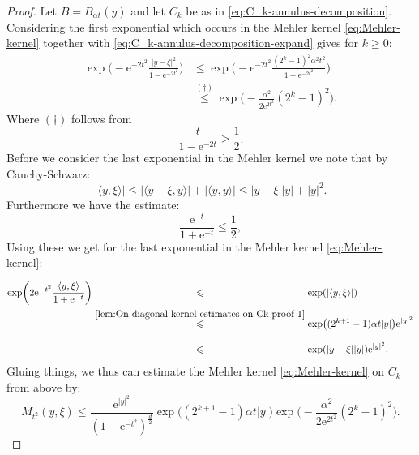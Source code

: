 \documentclass[a4paper,oneside,10pt]{amsproc}
\theoremstyle{remark}
\newcommand{\la}{\langle}
\newcommand{\ra}{\rangle}
\renewcommand{\leq}{\leqslant}
\renewcommand{\leq}{\leqslant}
\renewcommand{\geq}{\geqslant}
\newcommand{\e}{\mathrm{e}} %
\renewcommand{\leq}{\leqslant}%
\renewcommand{\geq}{\geqslant}%
\begin{document}
\begin{proof}
  Let $B = B_{\alpha t}(y)$ and let $C_k$ be as in
  \eqref{eq:C_k-annulus-decomposition}. Considering the first
  exponential which occurs in the Mehler kernel
  \eqref{eq:Mehler-kernel} together with
  \eqref{eq:C_k-annulus-decomposition-expand} gives for $k \geq 0$:
  \begin{align*}
    \exp\biggl(-\e^{-2t^2} \frac{|y - \xi|^2}{1 - \e^{-2t^2}} \biggr)
    &\leq \exp\biggl(-\e^{-2t^2} \frac{(2^k - 1)^2 \alpha^2 t^2}{1 - \e^{-2t^2}} \biggr)\\
    &\overset{(\dagger)}{\leq} \exp\biggl(-\frac{\alpha^2}{2 \e^{2t^2}} (2^k - 1)^2 \biggr).
  \end{align*}
  Where $(\dagger)$ follows from
  \begin{equation*}
    \frac{t}{1 - \e^{-2t}} \geq \frac12.
  \end{equation*}
  Before we consider the last exponential in the Mehler kernel we note
  that by Cauchy-Schwarz:
  \begin{equation}
    \label{lem:On-diagonal-kernel-estimates-on-Ck-proof-1}
    |\langle y, \xi \rangle| \leq |\la y - \xi, y \ra| + |\la y, y \ra|
    \leq |y - \xi||y| + |y|^2.
  \end{equation}
  Furthermore we have the estimate:
  \begin{equation*}
    \frac{\e^{-t}}{1 + \e^{-t}} \leq \frac12, 
  \end{equation*}
  Using these we get for the last exponential in the Mehler kernel
  \eqref{eq:Mehler-kernel}:
  \begin{align*}
    \exp\biggl(2\e^{-t^2} \frac{\la y, \xi \ra}{1 + \e^{-t}}
    \biggr)
    &\stackrel{\phantom{\eqref{lem:On-diagonal-kernel-estimates-on-Ck-proof-1}}}{\leq}
    \exp(|\la y, \xi \ra|)\\
    &\stackrel{\eqref{lem:On-diagonal-kernel-estimates-on-Ck-proof-1}}{\leq}
    \exp\bigl((2^{k + 1} - 1) \alpha t |y| \bigr) \e^{|y|^2}\\
    &\stackrel{\phantom{\eqref{lem:On-diagonal-kernel-estimates-on-Ck-proof-1}}}{\leq}
    \exp(|y - \xi||y|) \e^{|y|^2}.
  \end{align*}
  Gluing things, we thus can estimate the Mehler kernel
  \eqref{eq:Mehler-kernel} on $C_k$ from above by:
  \begin{equation*}
    M_{t^2}(y, \xi) \leq \frac{\e^{|y|^2}}{(1 - \e^{-{t^2}})^{\frac{d}2}}
    \exp\bigl((2^{k + 1} - 1) \alpha t |y| \bigr)
    \exp\biggl(-\frac{\alpha^2}{2 \e^{2t^2}} (2^k - 1)^2 \biggr). 
  \end{equation*}

\end{proof}
\end{document}

